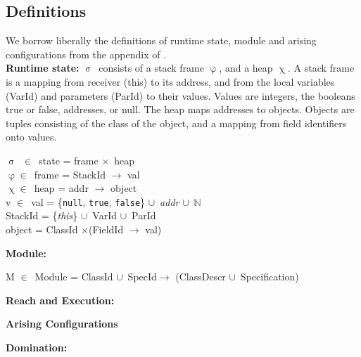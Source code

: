 \documentclass[a4paper,11pt, twoside,twocolumn]{article}
\newenvironment{logic}[1][]
{\begin{flushleft} \small }
{\end{flushleft}}
\newcommand{\loin}{$\in$}
\newcommand{\losigma}{$\upsigma$}
\newcommand{\lochi}{$\upchi$}
\newcommand{\lophi}{$\upvarphi$}
\newcommand{\locup} {$\cup$}
\newcommand{\lotimes} {$\times$}
\newcommand{\ablock} {\null\qquad}
\begin{document}
\subsection{Definitions}\noindent
We borrow liberally the definitions of runtime state, module and arising configurations from the appendix of \cite{drossopoulou2015b}.\\
\textbf{Runtime state:}
 \losigma\ consists of a stack frame \lophi, and a heap \lochi. A stack frame is a mapping from receiver (this) to its address, and from the local variables (VarId) and parameters (ParId) to their values. Values are integers, the booleans true or false, addresses, or null. The heap maps addresses to objects. Objects are tuples consisting of the class of the object, and a mapping from field identifiers onto values.
\begin{logic}[Runtime state]
\losigma\ \loin\ state = frame \lotimes\ heap \\
\lophi \loin\ frame = StackId $\rightarrow$ val \\
\lochi \loin\ heap = addr $\rightarrow$ object \\
v \loin\ val = \{\texttt{null}, \texttt{true}, \texttt{false}\} \locup\ \textit{addr} \locup\ $\mathbb{N}$ \\
StackId = \{\textit{this}\} \locup\ VarId \locup\ ParId \\
object = ClassId \lotimes (FieldId $\rightarrow$ val)
\end{logic}
\textbf{Module:}
\begin{logic}[Module]
M \loin\ Module = ClassId \locup\ SpecId\linebreak\ablock\qquad\qquad\quad $\rightarrow$ \linebreak
\ablock \qquad \qquad \quad (ClassDescr \locup\ Specification)
\end{logic}

\textbf{Reach and Execution:}\\
\begin{logic}[Reach and Execution]\end{logic}



\textbf{Arising Configurations}\\
\begin{logic}[Arising]\end{logic}



\textbf{Domination:}\\
\begin{logic}[Domination]\end{logic}
\end{document}

